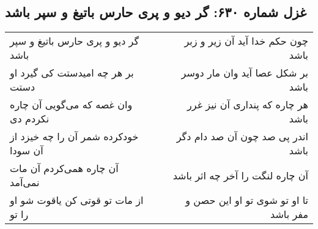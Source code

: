 \begin{center}
\section*{غزل شماره ۶۳۰: گر دیو و پری حارس باتیغ و سپر باشد}
\label{sec:0630}
\begin{longtable}{l p{0.5cm} r}
گر دیو و پری حارس باتیغ و سپر باشد
&&
چون حکم خدا آید آن زیر و زبر باشد
\\
بر هر چه امیدستت کی گیرد او دستت
&&
بر شکل عصا آید وان مار دوسر باشد
\\
وان غصه که می‌گویی آن چاره نکردم دی
&&
هر چاره که پنداری آن نیز غرر باشد
\\
خودکرده شمر آن را چه خیزد از آن سودا
&&
اندر پی صد چون آن صد دام دگر باشد
\\
آن چاره همی‌کردم آن مات نمی‌آمد
&&
آن چاره لنگت را آخر چه اثر باشد
\\
از مات تو قوتی کن یاقوت شو او را تو
&&
تا او تو شوی تو او این حصن و مفر باشد
\\
\end{longtable}
\end{center}
